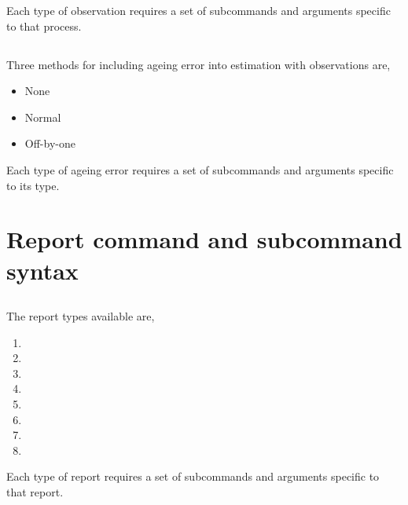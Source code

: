 Each type of observation requires a set of subcommands and arguments specific to that process.



\subsection{}


\subsection{}

Three methods for including ageing error into estimation with observations are,

\begin{itemize}
	\item None
	\item Normal
	\item Off-by-one
\end{itemize}

Each type of ageing error requires a set of subcommands and arguments specific to its type.



\section{Report command and subcommand syntax\label{sec:report-syntax}}

\subsection{}

The report types available are,

\begin{enumerate}
  \item 
  \item
  \item
  \item
  \item
  \item
  \item
  \item
\end{enumerate}

Each type of report requires a set of subcommands and arguments specific to that report.

\subsection{}

